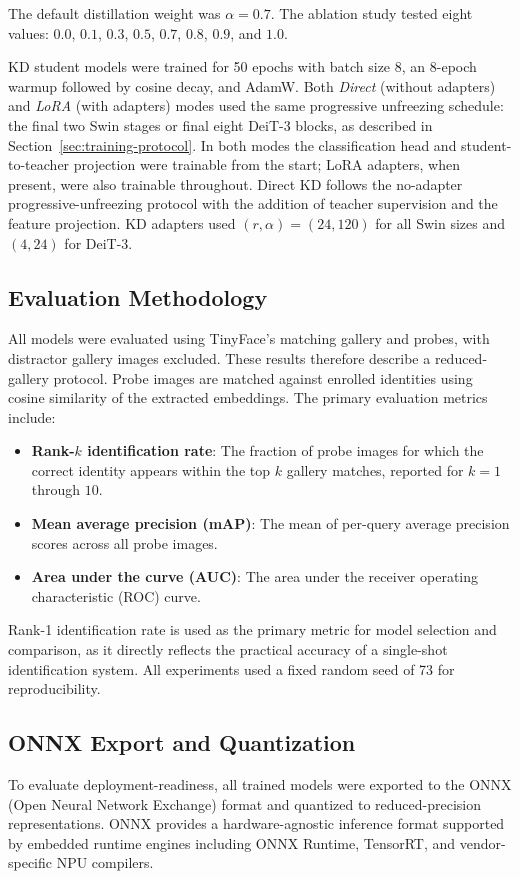 \documentclass[runningheads,a4paper]{llncs}
\begin{document}
The default distillation weight was $\alpha = 0.7$. The ablation study tested eight values: $0.0$, $0.1$, $0.3$, $0.5$, $0.7$, $0.8$, $0.9$, and $1.0$.

KD student models were trained for 50 epochs with batch size 8, an 8-epoch warmup followed by cosine decay, and AdamW. Both \emph{Direct} (without adapters) and \emph{LoRA} (with adapters) modes used the same progressive unfreezing schedule: the final two Swin stages or final eight DeiT-3 blocks, as described in Section~\ref{sec:training-protocol}. In both modes the classification head and student-to-teacher projection were trainable from the start; LoRA adapters, when present, were also trainable throughout. Direct KD follows the no-adapter progressive-unfreezing protocol with the addition of teacher supervision and the feature projection. KD adapters used $(r,\alpha)=(24,120)$ for all Swin sizes and $(4,24)$ for DeiT-3.

\subsection{Evaluation Methodology}
All models were evaluated using TinyFace's matching gallery and probes, with distractor gallery images excluded. These results therefore describe a reduced-gallery protocol. Probe images are matched against enrolled identities using cosine similarity of the extracted embeddings. The primary evaluation metrics include:
\begin{itemize}
    \item \textbf{Rank-$k$ identification rate}: The fraction of probe images for which the correct identity appears within the top $k$ gallery matches, reported for $k = 1$ through $10$.
    \item \textbf{Mean average precision (mAP)}: The mean of per-query average precision scores across all probe images.
    \item \textbf{Area under the curve (AUC)}: The area under the receiver operating characteristic (ROC) curve.
\end{itemize}
Rank-1 identification rate is used as the primary metric for model selection and comparison, as it directly reflects the practical accuracy of a single-shot identification system. All experiments used a fixed random seed of 73 for reproducibility.

\subsection{ONNX Export and Quantization}\label{sec:onnx-quant-setup}
To evaluate deployment-readiness, all trained models were exported to the ONNX (Open Neural Network Exchange) format and quantized to reduced-precision representations. ONNX provides a hardware-agnostic inference format supported by embedded runtime engines including ONNX Runtime, TensorRT, and vendor-specific NPU compilers.
\end{document}
